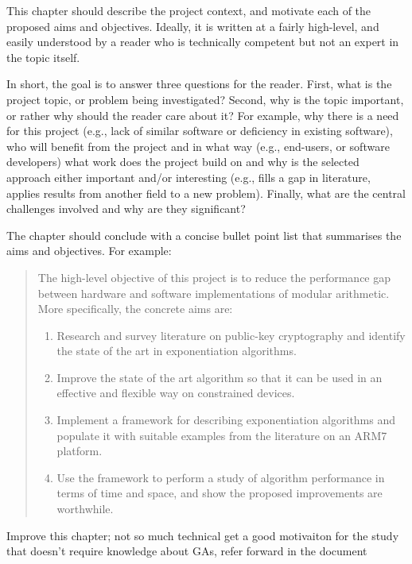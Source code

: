 {
\color{red}
\noindent
This chapter should describe the project context, and motivate each of
the proposed aims and objectives.  Ideally, it is written at a fairly
high-level, and easily understood by a reader who is technically
competent but not an expert in the topic itself.

In short, the goal is to answer three questions for the reader.  First,
what is the project topic, or problem being investigated?  Second, why
is the topic important, or rather why should the reader care about it?
For example, why there is a need for this project (e.g., lack of similar
software or deficiency in existing software), who will benefit from the
project and in what way (e.g., end-users, or software developers) what
work does the project build on and why is the selected approach either
important and/or interesting (e.g., fills a gap in literature, applies
results from another field to a new problem).  Finally, what are the
central challenges involved and why are they significant?

The chapter should conclude with a concise bullet point list that
summarises the aims and objectives.  For example:

\begin{quote}
\noindent
The high-level objective of this project is to reduce the performance
gap between hardware and software implementations of modular arithmetic.
More specifically, the concrete aims are:

\begin{enumerate}
\item Research and survey literature on public-key cryptography and
      identify the state of the art in exponentiation algorithms.
\item Improve the state of the art algorithm so that it can be used
      in an effective and flexible way on constrained devices.
\item Implement a framework for describing exponentiation algorithms
      and populate it with suitable examples from the literature on
      an ARM7 platform.
\item Use the framework to perform a study of algorithm performance
      in terms of time and space, and show the proposed improvements
      are worthwhile.
\end{enumerate}
\end{quote}
}

\todo Improve this chapter; not so much technical get a good motivaiton for the study
that doesn't require knowledge about GAs, refer forward in the document

